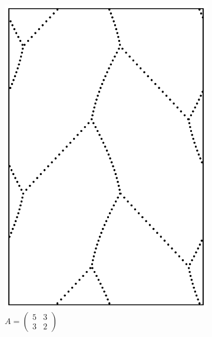 \documentclass[12pt,twoside]{reedthesis}
\theoremstyle{definition}
\begin{document}
\begin{figure}[h]
\begin{subfigure}[t]{0.31\textwidth}
    \includegraphics[width=\textwidth]{figures/subset_loop_pqpq_5_3_3_2.pdf}
    \caption*{$A = \begin{pmatrix}5 & 3 \\ 3 & 2\end{pmatrix}$}
  \end{subfigure}
  \hfill
  \begin{subfigure}[t]{0.31\textwidth}
    \centering

\end{subfigure}
\end{figure}
\end{document}
